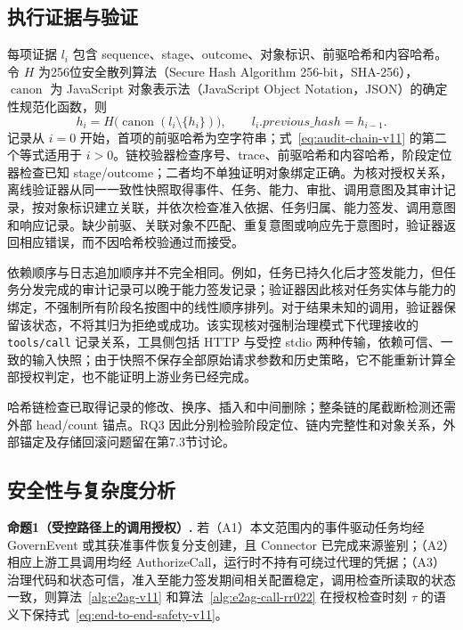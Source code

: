 \subsection{执行证据与验证}

每项证据 $l_i$ 包含 sequence、stage、outcome、对象标识、前驱哈希和内容哈希。令 $H$ 为256位安全散列算法（Secure Hash Algorithm 256-bit，SHA-256），$\operatorname{canon}$ 为 JavaScript 对象表示法（JavaScript Object Notation，JSON）的确定性规范化函数，则
\begin{equation}
h_i=H\bigl(\operatorname{canon}(l_i\setminus\{h_i\})\bigr),\qquad
l_i.previous\_hash=h_{i-1}.
\label{eq:audit-chain-v11}
\end{equation}
记录从 $i=0$ 开始，首项的前驱哈希为空字符串；式~\eqref{eq:audit-chain-v11} 的第二个等式适用于 $i>0$。链校验器检查序号、trace、前驱哈希和内容哈希，阶段定位器检查已知 stage/outcome；二者均不单独证明对象绑定正确。为核对授权关系，离线验证器从同一一致性快照取得事件、任务、能力、审批、调用意图及其审计记录，按对象标识建立关联，并依次检查准入依据、任务归属、能力签发、调用意图和响应记录。缺少前驱、关联对象不匹配、重复意图或响应先于意图时，验证器返回相应错误，而不因哈希校验通过而接受。

依赖顺序与日志追加顺序并不完全相同。例如，任务已持久化后才签发能力，但任务分发完成的审计记录可以晚于能力签发记录；验证器因此核对任务实体与能力的绑定，不强制所有阶段名按图中的线性顺序排列。对于结果未知的调用，验证器保留该状态，不将其归为拒绝或成功。该实现核对强制治理模式下代理接收的 \texttt{tools/call} 记录关系，工具侧包括 HTTP 与受控 stdio 两种传输，依赖可信、一致的输入快照；由于快照不保存全部原始请求参数和历史策略，它不能重新计算全部授权判定，也不能证明上游业务已经完成。

哈希链检查已取得记录的修改、换序、插入和中间删除；整条链的尾截断检测还需外部 head/count 锚点。RQ3 因此分别检验阶段定位、链内完整性和对象关系，外部锚定及存储回滚问题留在第7.3节讨论。

\subsection{安全性与复杂度分析}

\noindent\textbf{命题1（受控路径上的调用授权）.}
若（A1）本文范围内的事件驱动任务均经 GovernEvent 或其获准事件恢复分支创建，且 Connector 已完成来源鉴别；（A2）相应上游工具调用均经 AuthorizeCall，运行时不持有可绕过代理的凭据；（A3）治理代码和状态可信，准入至能力签发期间相关配置稳定，调用检查所读取的状态一致，则算法~\ref{alg:e2ag-v11} 和算法~\ref{alg:e2ag-call-rr022} 在授权检查时刻 $\tau$ 的语义下保持式~\eqref{eq:end-to-end-safety-v11}。


